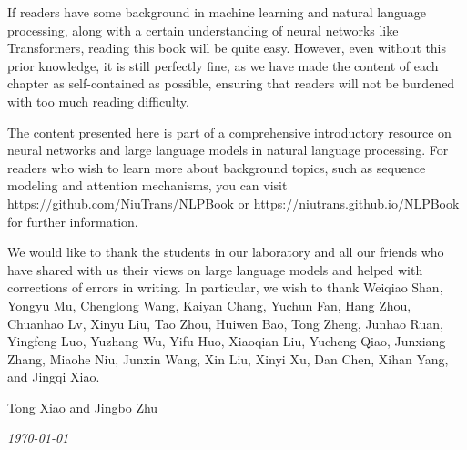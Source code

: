 If readers have some background in machine learning and natural language processing, along with a certain understanding of neural networks like Transformers, reading this book will be quite easy. However, even without this prior knowledge, it is still perfectly fine, as we have made the content of each chapter as self-contained as possible, ensuring that readers will not be burdened with too much reading difficulty.

The content presented here is part of a comprehensive introductory resource on neural networks and large language models in natural language processing. For readers who wish to learn more about background topics, such as sequence modeling and attention mechanisms, you can visit \url{https://github.com/NiuTrans/NLPBook} or \url{https://niutrans.github.io/NLPBook} for further information.

We would like to thank the students in our laboratory and all our friends who have shared with us their views on large language models and helped with corrections of errors in writing. In particular, we wish to thank Weiqiao Shan, Yongyu Mu, Chenglong Wang, Kaiyan Chang, Yuchun Fan, Hang Zhou, Chuanhao Lv, Xinyu Liu, Tao Zhou, Huiwen Bao, Tong Zheng, Junhao Ruan, Yingfeng Luo, Yuzhang Wu, Yifu Huo, Xiaoqian Liu, Yucheng Qiao, Junxiang Zhang, Miaohe Niu, Junxin Wang, Xin Liu, Xinyi Xu, Dan Chen, Xihan Yang, and Jingqi Xiao.

\vspace{3em}
\begin{flushright}
Tong Xiao and Jingbo Zhu

\textit{\today}
\end{flushright}
